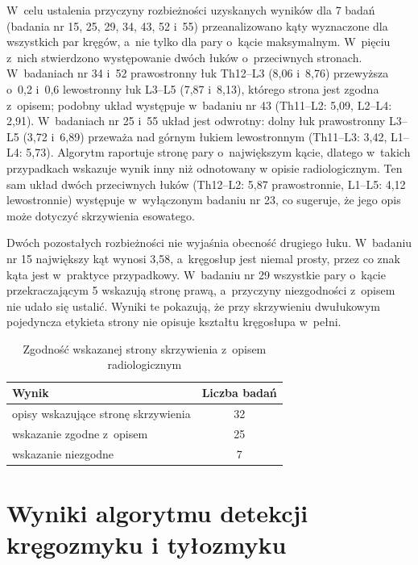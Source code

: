 W~celu ustalenia przyczyny rozbieżności uzyskanych wyników dla 7 badań (badania nr 15, 25, 29, 34, 43, 52 i~55) przeanalizowano kąty wyznaczone dla wszystkich par kręgów, a~nie tylko dla pary o~kącie maksymalnym.
W~pięciu z~nich stwierdzono występowanie dwóch łuków o~przeciwnych stronach.
W~badaniach nr 34 i~52 prawostronny łuk Th12--L3 (8,06\degree{} i~8,76\degree{}) przewyższa o~0,2\degree{} i~0,6\degree{} lewostronny łuk L3--L5 (7,87\degree{} i~8,13\degree{}), którego strona jest zgodna z~opisem; podobny układ występuje w~badaniu nr 43 (Th11--L2: 5,09\degree{}, L2--L4: 2,91\degree{}).
W~badaniach nr 25 i~55 układ jest odwrotny: dolny łuk prawostronny L3--L5 (3,72\degree{} i~6,89\degree{}) przeważa nad górnym łukiem lewostronnym (Th11--L3: 3,42\degree{}, L1--L4: 5,73\degree{}).
Algorytm raportuje stronę pary o~największym kącie, dlatego w~takich przypadkach wskazuje wynik inny niż odnotowany w opisie radiologicznym.
Ten sam układ dwóch przeciwnych łuków (Th12--L2: 5,87\degree{} prawostronnie, L1--L5: 4,12\degree{} lewostronnie) występuje w~wyłączonym badaniu nr 23, co sugeruje, że jego opis może dotyczyć skrzywienia esowatego.

Dwóch pozostałych rozbieżności nie wyjaśnia obecność drugiego łuku.
W~badaniu nr 15 największy kąt wynosi 3,58\degree{}, a~kręgosłup jest niemal prosty, przez co znak kąta jest w~praktyce przypadkowy.
W~badaniu nr 29 wszystkie pary o~kącie przekraczającym 5\degree{} wskazują stronę prawą, a~przyczyny niezgodności z~opisem nie udało się ustalić.
Wyniki te pokazują, że przy skrzywieniu dwułukowym pojedyncza etykieta strony nie opisuje kształtu kręgosłupa w~pełni.

\begin{table}[H]
    \centering
    \captionsetup{justification=centering, font=small}
    \caption{Zgodność wskazanej strony skrzywienia z~opisem radiologicznym}
    \label{tab:strona-skolioza}
    \begin{tabular}{lc}
        \hline
        \textbf{Wynik} & \textbf{Liczba badań} \\
        \hline
        opisy wskazujące stronę skrzywienia & 32 \\
        wskazanie zgodne z~opisem           & 25 \\
        wskazanie niezgodne                 & 7  \\
        \hline
    \end{tabular}
\end{table}

\section{Wyniki algorytmu detekcji kręgozmyku i tyłozmyku}
\label{sec:wyniki-kregozmyk}


